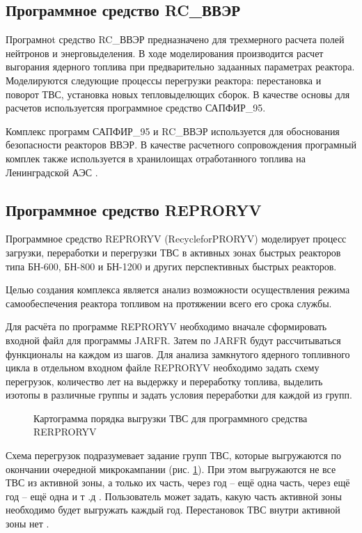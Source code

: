 \subsection{Программное средство RC\_ВВЭР}

Програмноt средство RC\_ВВЭР предназначено для трехмерного расчета полей нейтронов и энерговыделения.
В ходе моделирования производится расчет выгорания ядерного топлива при предварительно задаанных параметрах реактора.
Моделируются следующие процессы перегрузки реактора: перестановка и поворот ТВС, установка новых тепловыделющих сборок.
В качестве основы для расчетов используетсяя программное средство САПФИР\_95.

Комплекс программ САПФИР\_95 и RC\_ВВЭР используется для обоснования безопасности реакторов ВВЭР.
В качестве расчетного сопровождения програмный комплек также используется в хранилоищах отработанного топлива на Ленинградской АЭС \cite{rc-wwr}.

\subsection{Программное средство REPRORYV}

Программное средство REPRORYV  (RecycleforPRORYV) моделирует процесс загрузки, переработки и перегрузки ТВС в активных зонах быстрых реакторов типа БН-600, БН-800 и БН-1200 и других перспективных быстрых реакторов.

Целью создания комплекса является анализ возможности осуществления режима самообеспечения реактора топливом на протяжении всего его срока службы.
 
Для расчёта по программе  REPRORYV  необходимо вначале сформировать входной файл для программы JARFR.
Затем по  JARFR  будут рассчитываться функционалы на каждом из шагов.
Для анализа замкнутого ядерного топливного цикла в отдельном входном файле  REPRORYV  необходимо задать схему перегрузок,  количество лет на выдержку и переработку топлива,  выделить изотопы в различные группы и задать условия переработки для каждой из групп.

\begin{figure}[ht]
    \caption{Картограмма порядка выгрузки ТВС для программного средства RERPRORYV}
    \label{pic:cartogram}
    \end{figure}

Схема перегрузок подразумевает задание групп ТВС,  которые выгружаются по окончании очередной микрокампании (рис. \ref{pic:cartogram}). 
При этом выгружаются не все ТВС из активной зоны,  а только их часть,  через год  --  ещё одна часть,  через ещё год  --  ещё одна и т .д . 
Пользователь может задать,  какую часть активной зоны необходимо будет выгружать каждый год. 
Перестановок ТВС внутри активной зоны нет \cite{reproryv}.


